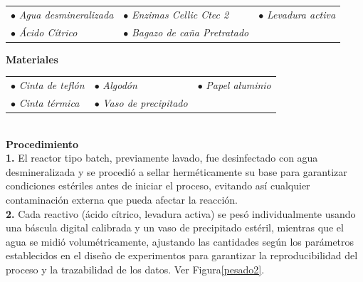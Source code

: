 \documentclass[12pt]{article}
\begin{document}
				\begin{tabular}{p{0.3\textwidth}p{}p{}}	 
					 	 	$\bullet$ \textit{Agua desmineralizada} & $\bullet$ \textit{Enzimas Cellic Ctec 2}  & $\bullet$ \textit{Levadura activa} \\
					 $\bullet$ \textit{Ácido Cítrico} & $\bullet$ \textit{Bagazo de caña Pretratado} & \\
					
					\end{tabular}
					 
					 
					 	\textbf{Materiales} 
					 
					 \begin{tabular}{p{}p{}p{}}
					 $\bullet$ \textit{Cinta de teflón} & $\bullet$ \textit{Algodón } & $\bullet$ \textit{ Papel aluminio} \\
					 	$\bullet$ \textit{Cinta térmica}  & $\bullet$ \textit{Vaso de precipitado} &
					 \end{tabular}
					 \\[0.5em]
					 
					 
					 
		  \textbf{Procedimiento}
					\\[0.5em]	 
		 \textbf{1.}  El reactor tipo batch, previamente lavado, fue desinfectado con agua desmineralizada y se procedió a sellar herméticamente su base para garantizar condiciones estériles antes de iniciar el proceso, evitando así cualquier contaminación externa que pueda afectar la reacción.\\[0.5em]

		 	
		 \textbf{2.} Cada reactivo (ácido cítrico, levadura activa) se pesó individualmente usando una báscula digital calibrada y un vaso de precipitado estéril, mientras que el agua se midió volumétricamente, ajustando las cantidades según los parámetros establecidos en el diseño de experimentos para garantizar la reproducibilidad del proceso y la trazabilidad de los datos. Ver Figura\ref{pesado2}.
		 
	
		 
\end{document}
